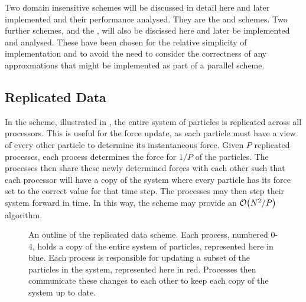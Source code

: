 %
Two domain insensitive schemes will be discussed in detail here and
later implemented and their performance analysed.
%
They are the \replicateddata{} and \systolicloop{} schemes.
%
Two further schemes, \sharedandreplicateddata{} and the
\replicatedsystolicloop{}, will also be discissed here and
later be implemented and analysed.
%
These have been chosen for the relative simplicity of implementation
and to avoid the need to consider the correctness of any
approxmations that might be implemented as part of a parallel scheme.



\subsection{Replicated Data}
\label{sec:background:subsec:replicated_data}

%
In the \replicateddata{} scheme, illustrated in
,
the entire system of particles is replicated across all processors.
%
This is useful for the force update, as each particle must have a view of
every other particle to determine its instantaneous force.
%
Given $P$ replicated processes,
each process determines the force for $1/P$ of the particles.
%
The processes then share these newly determined forces with each other
such that each processor will have a copy of the system where every
particle has its force set to the correct value for that time step.
%
The processes may then step their system forward in time.
%
In this way, the \replicateddata{} scheme may provide
an $\mathcal{O}{\left({ N^2/P }\right)}$ algorithm.


\begin{figure}[!ht]
    \begin{center}
    \end{center}
    \caption{
        An outline of the replicated data scheme.
        Each process, numbered 0-4,
        holds a copy of the entire system of particles,
        represented here in blue.
        Each process is responsible for updating a subset of the
        particles in the system, represented here in red.
        Processes then communicate these changes to each other
        to keep each copy of the system up to date.
    }
    \label{fig:replicated_data_illustration}
\end{figure}


